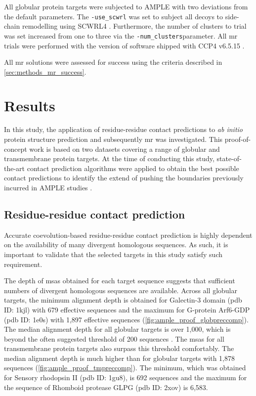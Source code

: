 All globular protein targets were subjected to AMPLE with two deviations from the default parameters. The \texttt{-use\_scwrl} was set to subject all decoys to side-chain remodelling using SCWRL4 \cite{Krivov2009-ex}. Furthermore, the number of clusters to trial was set increased from one to three via the \texttt{-num\_clusters}parameter. All \gls{mr} trials were performed with the version of software shipped with CCP4 v6.5.15 \cite{Winn2011-xe}.

All \gls{mr} solutions were assessed for success using the criteria described in \cref{sec:methods_mr_success}.

\section{Results}
In this study, the application of residue-residue contact predictions to \textit{ab initio} protein structure prediction and subsequently \gls{mr} was investigated. This proof-of-concept work is based on two datasets covering a range of globular and transmembrane protein targets. At the time of conducting this study, state-of-the-art contact prediction algorithms were applied to obtain the best possible contact predictions to identify the extend of pushing the boundaries previously incurred in AMPLE studies \cite{Bibby2012-lm}.

\subsection{Residue-residue contact prediction}
Accurate coevolution-based residue-residue contact prediction is highly dependent on the availability of many divergent homologous sequences. As such, it is important to validate that the selected targets in this study satisfy such requirement.

The depth of \gls{msa}s obtained for each target sequence suggests that sufficient numbers of divergent homologous sequences are available. Across all globular targets, the minimum alignment depth is obtained for Galectin-3 domain (\gls{pdb} ID: 1kjl) with 679 effective sequences and the maximum for G-protein Arf6-GDP (\gls{pdb} ID: 1e0s) with 1,897 effective sequences (\cref{fig:ample_proof_globpreccomp}). The median alignment depth for all globular targets is over 1,000, which is beyond the often suggested threshold of 200 sequences \cite{Simkovic2017-xs}. The \gls{msa}s for all transmembrane protein targets also surpass this threshold comfortably. The median alignment depth is much higher than for globular targets with 1,878 sequences (\cref{fig:ample_proof_tmpreccomp}). The minimum, which was obtained for Sensory rhodopsin II (\gls{pdb} ID: 1gu8), is 692 sequences and the maximum for the sequence of Rhomboid protease GLPG (\gls{pdb} ID: 2xov) is 6,583.

